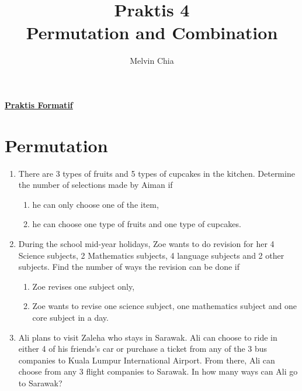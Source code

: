 \documentclass{report}
\title{Praktis 4\\Permutation and Combination}
\author{Melvin Chia}
\begin{document}
\maketitle

\begin{multicols*}{2}
      \noindent\Large{\underline{\textbf{Praktis Formatif}}}
      \normalsize
      \section{Permutation}
      \begin{enumerate}
            \item There are 3 types of fruits and 5 types of cupcakes in the kitchen. Determine
                  the number of selections made by Aiman if
                  \begin{enumerate}
                        \item he can only choose one of the item,
                        \item he can choose one type of fruits and one type of cupcakes.
                  \end{enumerate}

            \item During the school mid-year holidays, Zoe wants to do revision for her 4 Science
                  subjects, 2 Mathematics subjects, 4 language subjects and 2 other subjects.
                  Find the number of ways the revision can be done if
                  \begin{enumerate}
                        \item Zoe revises one subject only,
                        \item Zoe wants to revise one science subject, one mathematics subject and one core
                              subject in a day.
                  \end{enumerate}

            \item Ali plans to visit Zaleha who stays in Sarawak. Ali can choose to ride in
                  either 4 of his friends's car or purchase a ticket from any of the 3 bus
                  companies to Kuala Lumpur International Airport. From there, Ali can choose
                  from any 3 flight companies to Sarawak. In how many ways can Ali go to Sarawak?


\end{enumerate}
\end{multicols*}
\end{document}
